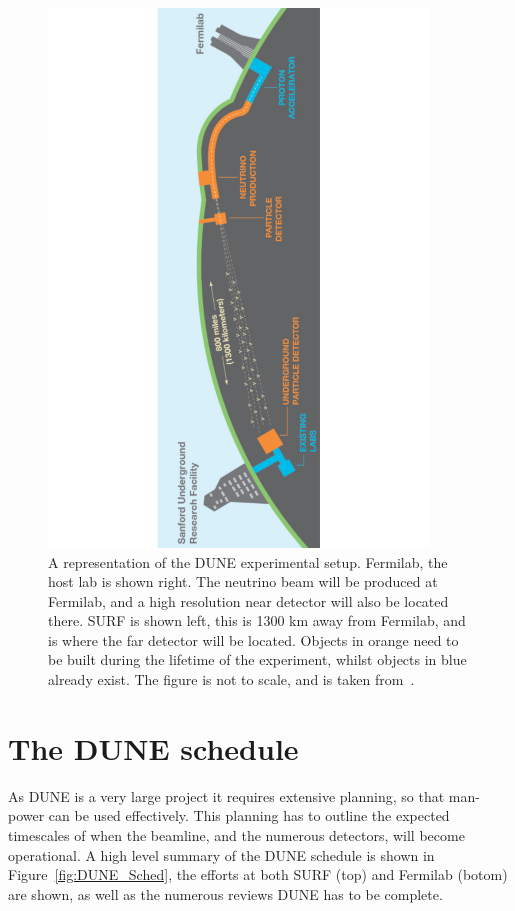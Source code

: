 \begin{figure}
  \centering
  \includegraphics[width=0.9\textwidth]{DUNESchematic}
  \caption[A representation of the DUNE experimental setup]
          {A representation of the DUNE experimental setup. Fermilab, the host lab is shown right. The neutrino beam will be produced at Fermilab, and a high resolution near detector will also be located there. SURF is shown left, this is 1300 km away from Fermilab, and is where the far detector will be located. Objects in orange need to be built during the lifetime of the experiment, whilst objects in blue already exist. The figure is not to scale, and is taken from~\citep{DUNECDR_V1}.}
  \label{fig:DUNESchematic}
\end{figure}

\section{The DUNE schedule} \label{sec:DUNESched} %
As DUNE is a very large project it requires extensive planning, so that man-power can be used effectively. This planning has to outline the expected timescales of when the beamline, and the numerous detectors, will become operational. A high level summary of the DUNE schedule is shown in Figure~\ref{fig:DUNE_Sched}, the efforts at both SURF (top) and Fermilab (botom) are shown, as well as the numerous reviews DUNE has to be complete. \\ 

